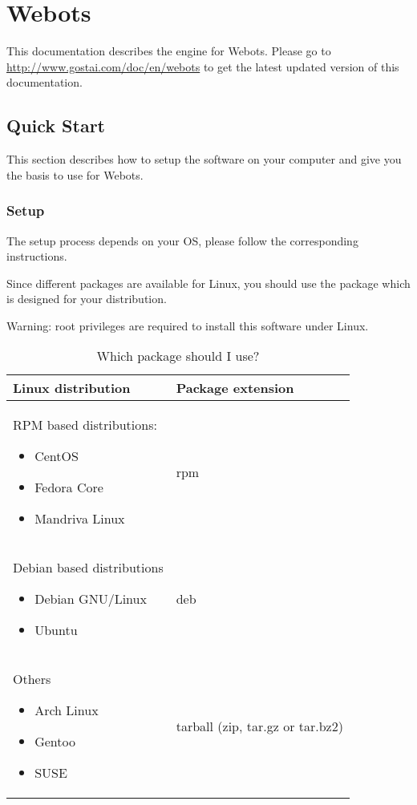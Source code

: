 \chapter{Webots}
\label{sec:webots}


This documentation describes the \urbi engine for Webots.  Please go to
\url{http://www.gostai.com/doc/en/webots} to get the latest updated
version of this documentation.



\section{Quick Start}
\label{webots.quickstart}%

This section describes how to setup the software on your computer and
give you the basis to use \urbi for Webots.


\subsection{Setup}
\label{webots.setup}%

The setup process depends on your OS, please follow the corresponding
instructions.

Since different packages are available for Linux, you should use the
package which is designed for your distribution.

Warning: root privileges are required to install this software under
Linux.

\begin{table}[htbp]
  \begin{center}
    \begin{tabular}{p{.4\linewidth}l}
      \hline
      Linux distribution &    Package extension\\
      \hline
      RPM based distributions:
      \begin{itemize}
      \item CentOS
      \item Fedora Core
      \item Mandriva Linux
      \end{itemize}
      &
      rpm\\
      Debian based distributions
      \begin{itemize}
      \item Debian GNU/Linux
      \item Ubuntu
      \end{itemize}
      &
      deb \\
      Others
      \begin{itemize}
      \item Arch Linux
      \item Gentoo
      \item SUSE
      \end{itemize}
      &
      tarball (zip, tar.gz or tar.bz2)\\
      \hline
    \end{tabular}
  \end{center}
  \caption{Which package should I use?}
  \label{webots.setup.distributions}%
\end{table}


